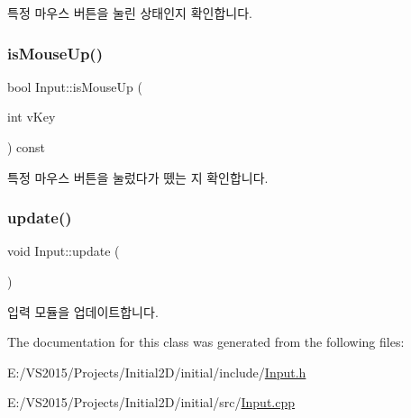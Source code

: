 특정 마우스 버튼을 눌린 상태인지 확인합니다. \mbox{\label{class_input_aed53e73611a1a265ece72b8b90479659}} 
\subsubsection{\texorpdfstring{isMouseUp()}{isMouseUp()}}
{\footnotesize\ttfamily bool Input\+::is\+Mouse\+Up (\begin{DoxyParamCaption}\item[{int}]{v\+Key }\end{DoxyParamCaption}) const}

특정 마우스 버튼을 눌렀다가 뗐는 지 확인합니다. \mbox{\label{class_input_aa7fe26710dd863d11737bf2f6de4ad05}} 
\subsubsection{\texorpdfstring{update()}{update()}}
{\footnotesize\ttfamily void Input\+::update (\begin{DoxyParamCaption}{ }\end{DoxyParamCaption})}

입력 모듈을 업데이트합니다. 

The documentation for this class was generated from the following files\+:\begin{DoxyCompactItemize}
\item 
E\+:/\+V\+S2015/\+Projects/\+Initial2\+D/initial/include/\mbox{\hyperlink{_input_8h}{Input.\+h}}\item 
E\+:/\+V\+S2015/\+Projects/\+Initial2\+D/initial/src/\mbox{\hyperlink{_input_8cpp}{Input.\+cpp}}\end{DoxyCompactItemize}
